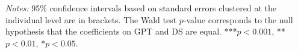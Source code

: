 \begin{table}[H]
\begin{threeparttable}
\begin{tabular}{l*{5}{c}}
\bottomrule\bottomrule
\end{tabular}
\begin{tablenotes}[flushleft]
\footnotesize
\item \textit{Notes:} 95\% confidence intervals based on standard errors clustered at the individual level are in brackets. The Wald test $p$-value corresponds to the null hypothesis that the coefficients on GPT and DS are equal. ***$p<0.001$, **$p<0.01$, *$p<0.05$.
\end{tablenotes}
\end{threeparttable}
\end{table}
